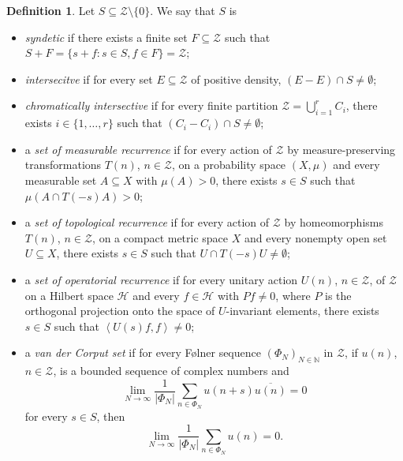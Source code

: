 \documentclass[11pt]{amsart}
\theoremstyle{theorem}
\theoremstyle{definition}
\newtheorem{definition}[theorem]{Definition}
\newcommand{\N}{\mathbb{N}}
\newcommand{\mZ}{\mathcal{Z}}
\newcommand{\mH}{\mathcal{H}}
\newcommand{\es}{\emptyset}
\begin{document}
\begin{definition} \label{definitions}
    Let $S \subseteq \mZ \setminus \{0\}$.
    We say that $S$ is
    \begin{itemize}
        \item \emph{syndetic} if there exists a finite set $F \subseteq \mZ$ such that $S + F = \{s+f : s \in S, f \in F\} = \mZ$;
        \item \emph{intersecitve} if for every set $E \subseteq \mZ$ of positive density, $(E - E) \cap S \ne \es$;
        \item \emph{chromatically intersective} if for every finite partition $\mZ = \bigcup_{i=1}^r C_i$, there exists $i \in \{1,\ldots, r\}$ such that $(C_i - C_i) \cap S \ne \es$;
        \item a \emph{set of measurable recurrence} if for every action of $\mZ$ by measure-preserving transformations $T(n)$, $n \in \mZ$, on a probability space $(X, \mu)$ and every measurable set $A \subseteq X$ with $\mu(A) > 0$, there exists $s \in S$ such that $\mu(A \cap T(-s)A) > 0$;
        \item a \emph{set of topological recurrence} if for every action of $\mZ$ by homeomorphisms $T(n)$, $n \in \mZ$, on a compact metric space $X$ and every nonempty open set $U \subseteq X$, there exists $s \in S$ such that $U \cap T(-s)U \ne \es$;
        \item a \emph{set of operatorial recurrence} if for every unitary action $U(n)$, $n \in \mZ$, of $\mZ$ on a Hilbert space $\mH$ and every $f \in \mH$ with $Pf \ne 0$, where $P$ is the orthogonal projection onto the space of $U$-invariant elements, there exists $s \in S$ such that $\left\langle U(s)f, f \right\rangle \ne 0$;
        \item a \emph{van der Corput set} if for every F{\o}lner sequence $(\Phi_N)_{N \in \N}$ in $\mZ$, if $u(n)$, $n \in \mZ$, is a bounded sequence of complex numbers and
        \begin{equation*}
            \lim_{N \to \infty} \frac{1}{|\Phi_N|} \sum_{n \in \Phi_N} u(n+s) \overline{u(n)} = 0
        \end{equation*}
        for every $s \in S$, then
        \begin{equation*}
            \lim_{N \to \infty} \frac{1}{|\Phi_N|} \sum_{n \in \Phi_N} u(n) = 0.
        \end{equation*}
    \end{itemize}
\end{definition}
\end{document}
